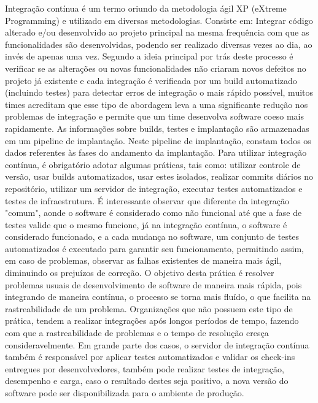 \documentclass[twoside,english,brazilian]{UNISINOSartigo}
\begin{document}
Integração contínua é um termo oriundo da metodologia ágil XP (eXtreme Programming) e utilizado em diversas metodologias. Consiste em: Integrar código alterado e/ou desenvolvido ao projeto principal na mesma frequência com que as funcionalidades são desenvolvidas, podendo ser realizado diversas vezes ao dia, ao invés de apenas uma vez. Segundo  a ideia principal por trás deste processo é verificar se as alterações ou novas funcionalidades não criaram novos defeitos no projeto já existente e cada integração é verificada por um build automatizado (incluindo testes) para detectar erros de integração o mais rápido possível, muitos times acreditam que esse tipo de abordagem leva a uma significante redução nos problemas de integração e permite que um time desenvolva software coeso mais rapidamente. As informações sobre builds, testes e implantação são armazenadas em um pipeline de implantação. Neste pipeline de implantação, constam todos os dados referentes às fases do andamento da implantação. Para utilizar integração contínua, é obrigatório adotar algumas práticas, tais como: utilizar controle de versão, usar builds automatizados, usar estes isolados, realizar commits diários no repositório, utilizar um servidor de integração, executar testes automatizados e testes de infraestrutura. É interessante observar que diferente da integração "comum", aonde o software é considerado como não funcional até que a fase de testes valide que o mesmo funcione, já na integração contínua, o software é considerado funcionado, e a cada mudança no software, um conjunto de testes automatizados é executado para garantir seu funcionamento, permitindo assim, em caso de problemas, observar as falhas existentes de maneira mais ágil, diminuindo os prejuízos de correção.  
O objetivo desta prática é resolver problemas usuais de desenvolvimento de software de maneira mais rápida, pois integrando de maneira contínua, o processo se torna mais fluído, o que facilita na rastreabilidade de um problema. Organizações que não possuem este tipo de prática, tendem a realizar integrações após longos períodos de tempo, fazendo com que a rastreabilidade de problemas e o tempo de resolução cresça consideravelmente. Em grande parte dos casos, o servidor de integração contínua também é responsável por aplicar testes automatizados e validar os check-ins entregues por desenvolvedores, também pode realizar testes de integração, desempenho e carga, caso o resultado destes seja positivo, a nova versão do software pode ser disponibilizada para o ambiente de produção.
\end{document}
